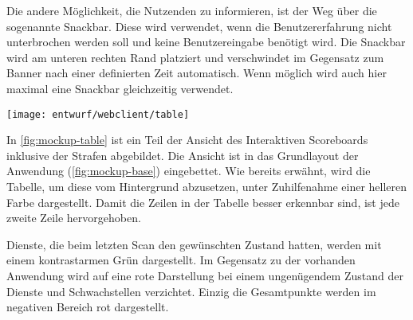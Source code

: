 Die andere Möglichkeit, die Nutzenden zu informieren, ist der Weg über die sogenannte Snackbar. Diese wird verwendet, wenn die Benutzererfahrung nicht unterbrochen werden soll und keine Benutzereingabe benötigt wird.
Die Snackbar wird am  unteren rechten Rand platziert und verschwindet im Gegensatz zum Banner nach einer definierten Zeit automatisch. Wenn möglich wird auch hier maximal eine Snackbar gleichzeitig verwendet.

\begin{center}
	\texttt{[image: entwurf/webclient/table]}
	\label{fig:mockup-table}
\end{center}

In \autoref{fig:mockup-table} ist ein Teil der Ansicht des Interaktiven Scoreboards inklusive der Strafen abgebildet. Die Ansicht ist in das Grundlayout der Anwendung (\autoref{fig:mockup-base}) eingebettet. Wie bereits erwähnt, wird die Tabelle, um diese vom Hintergrund abzusetzen, unter Zuhilfenahme einer helleren Farbe dargestellt. Damit die Zeilen in der Tabelle besser erkennbar sind, ist jede zweite Zeile hervorgehoben. 

Dienste, die beim letzten Scan den gewünschten Zustand hatten, werden mit einem kontrastarmen Grün dargestellt. Im Gegensatz zu der vorhanden Anwendung wird auf eine rote Darstellung bei einem ungenügendem Zustand der Dienste und Schwachstellen verzichtet. Einzig die Gesamtpunkte werden im negativen Bereich rot dargestellt.
